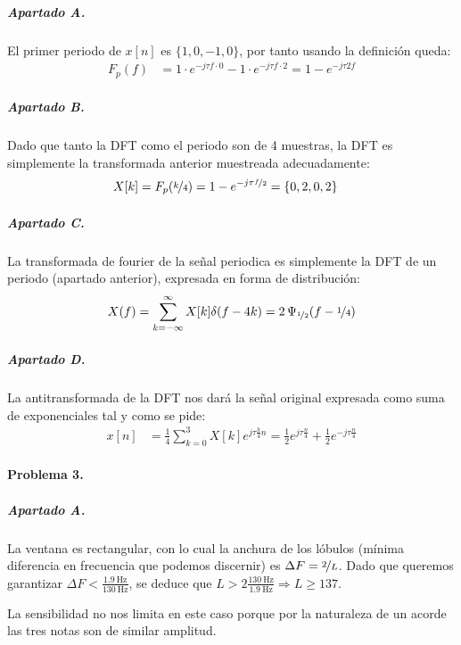 \subparagraph{Apartado A.}

El primer periodo de $x[n]$ es $\{ 1, 0, -1, 0 \}$, por tanto usando la
definición queda:
%
\begin{align*}
  F_p(f) &= 1\cdot e^{-j\tau f \cdot 0} -1\cdot e^{-j\tau f \cdot 2}
    = 1 - e^{-j\tau 2 f}
\end{align*}

\subparagraph{Apartado B.}

Dado que tanto la DFT como el periodo son de 4 muestras, la DFT es simplemente
la transformada anterior muestreada adecuadamente:
%
\begin{align*}
  X[k] &= F_p( \nicefrac{k}{4} ) = 1 - e^{-j\tau \nicefrac{f}{2}} =
    \{ 0, 2, 0, 2 \}
\end{align*}

\subparagraph{Apartado C.}

La transformada de fourier de la señal periodica es simplemente la DFT
de un periodo (apartado anterior), expresada en forma de distribución:
%
\begin{align*}
  X(f) = \sum_{k = -\infty}^{\infty} X[k] \delta(f - 4k)
    = 2 \, \Psi_{\nicefrac{1}{2}}(f - \nicefrac{1}{4})
\end{align*}

\subparagraph{Apartado D.}

La antitransformada de la DFT nos dará la señal original expresada como suma
de exponenciales tal y como se pide:
%
\begin{align*}
  x[n] &= \frac{1}{4} \sum_{k = 0}^{3} X[k] e^{j\tau \frac{k}{4} n}
    = \frac{1}{2} e^{j\tau \frac{n}{4}}
    + \frac{1}{2} e^{-j\tau \frac{n}{4}}
\end{align*}

\finishpage
\startpage

\paragraph{Problema 3.}

\subparagraph{Apartado A.}

La ventana es rectangular, con lo cual la anchura de los lóbulos (mínima
diferencia en frecuencia que podemos discernir) es $\Delta F = \nicefrac{2}{L}$.
Dado que queremos garantizar $\Delta F < \frac{\SI{1.9}{\hertz}}
{\SI{130}{\hertz}}$, se deduce que $L >
2\frac{\SI{130}{\hertz}}{\SI{1.9}{\hertz}} \Rightarrow L \geq \num{137}$.

La sensibilidad no nos limita en este caso porque por la naturaleza de un
acorde las tres notas son de similar amplitud.

